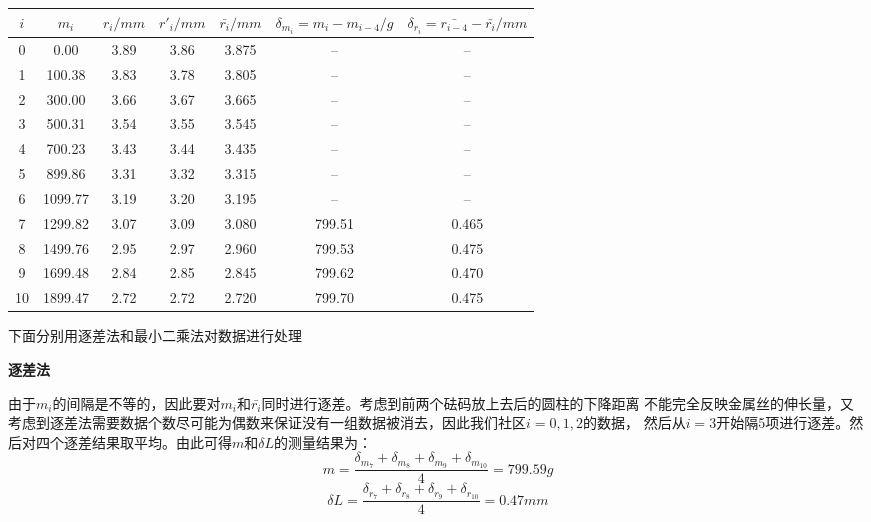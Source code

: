 \documentclass{article}
\begin{document}
    \begin{center}
        \begin{tabular}{|c|c|c|c|c|c|c|}
            \hline
            $i$     & $m_i$    & $r_i/mm$ & $r'_i/mm$ & $\bar{r_i}/mm$ & $\delta_{m_i}=m_i-m_{i-4}/g$ & $\delta_{r_i}=\bar{r_{i-4}}-\bar{r_i}/mm$ \bigstrut\\
            \hline
            0  & 0.00  & 3.89  & 3.86  & 3.875 & -- & -- \bigstrut\\
            \hline
            1  & 100.38  & 3.83  & 3.78  & 3.805 & -- & -- \bigstrut\\
            \hline
            2  & 300.00  & 3.66  & 3.67  & 3.665 & -- & -- \bigstrut\\
            \hline
            3  & 500.31  & 3.54  & 3.55  & 3.545 & -- & -- \bigstrut\\
            \hline
            4  & 700.23  & 3.43  & 3.44  & 3.435 & -- & -- \bigstrut\\
            \hline
            5  & 899.86  & 3.31  & 3.32  & 3.315 & -- & -- \bigstrut\\
            \hline
            6  & 1099.77  & 3.19  & 3.20  & 3.195 & -- & -- \bigstrut\\
            \hline
            7  & 1299.82  & 3.07  & 3.09  & 3.080 & 799.51 & 0.465 \bigstrut\\
            \hline
            8  & 1499.76  & 2.95  & 2.97  & 2.960  & 799.53 & 0.475 \bigstrut\\
            \hline
            9  & 1699.48  & 2.84  & 2.85  & 2.845 & 799.62 & 0.470 \bigstrut\\
            \hline
            10  & 1899.47  & 2.72  & 2.72  & 2.720 & 799.70 & 0.475 \bigstrut\\
            \hline
        \end{tabular}%
    \end{center}

   下面分别用逐差法和最小二乘法对数据进行处理

    \textbf{逐差法}
    
    由于$m_i$的间隔是不等的，因此要对$m_i$和$\bar{r_i}$同时进行逐差。考虑到前两个砝码放上去后的圆柱的下降距离
    不能完全反映金属丝的伸长量，又考虑到逐差法需要数据个数尽可能为偶数来保证没有一组数据被消去，因此我们社区$i=0,1,2$的数据，
    然后从$i=3$开始隔5项进行逐差。然后对四个逐差结果取平均。由此可得$m$和$\delta L$的测量结果为：
    $$m=\frac{\delta_{m_7}+\delta_{m_8}+\delta_{m_9}+\delta_{m_10}}{4}=799.59g$$
    $$\delta L=\frac{\delta_{r_7}+\delta_{r_8}+\delta_{r_9}+\delta_{r_10}}{4}=0.47mm$$
\end{document}
